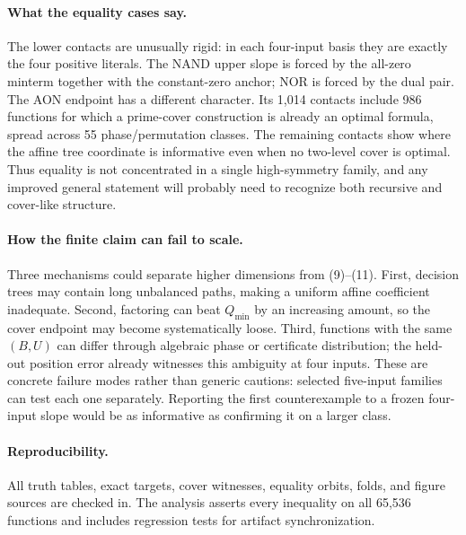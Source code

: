\documentclass[10pt]{article}
\begin{document}
\paragraph{What the equality cases say.}
The lower contacts are unusually rigid: in each four-input basis they are
exactly the four positive literals.  The NAND upper slope is forced by the
all-zero minterm together with the constant-zero anchor; NOR is forced by the
dual pair.  The AON endpoint has a different character.  Its 1,014 contacts
include 986 functions for which a prime-cover construction is already an
optimal formula, spread across 55 phase/permutation classes.  The remaining
contacts show where the affine tree coordinate is informative even when no
two-level cover is optimal.  Thus equality is not concentrated in a single
high-symmetry family, and any improved general statement will probably need
to recognize both recursive and cover-like structure.

\paragraph{How the finite claim can fail to scale.}
Three mechanisms could separate higher dimensions from (9)--(11).  First,
decision trees may contain long unbalanced paths, making a uniform affine
coefficient inadequate.  Second, factoring can beat $Q_{\min}$ by an
increasing amount, so the cover endpoint may become systematically loose.
Third, functions with the same $(B,U)$ can differ through algebraic phase or
certificate distribution; the held-out position error already witnesses
this ambiguity at four inputs.  These are concrete failure modes rather than
generic cautions: selected five-input families can test each one separately.
Reporting the first counterexample to a frozen four-input slope would be as
informative as confirming it on a larger class.

\paragraph{Reproducibility.}
All truth tables, exact targets, cover witnesses, equality orbits, folds, and
figure sources are checked in.  The analysis asserts every inequality on all
65,536 functions and includes regression tests for artifact synchronization.
\end{document}
